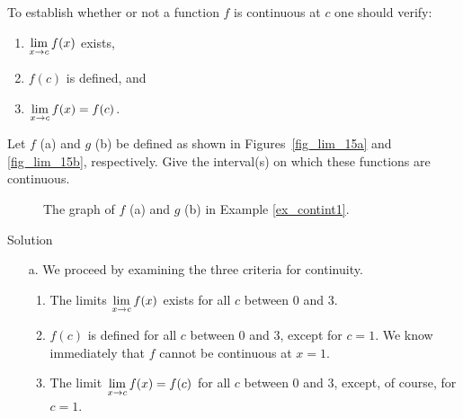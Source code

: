 To establish whether or not a function $f$ is continuous at $c$ one should verify:
		\begin{enumerate}
		\item		$\displaystyle \lim_{x\to c} f(x)$ exists,
		\item		$f(c)$ is defined, and 
		\item		$\displaystyle \lim_{x\to c} f(x) = f(c)$.
		\end{enumerate}
		
		



\begin{example}\label{ex_contint1}
Let $f$ (a) and $g$ (b) be defined as shown in Figures~\ref{fig_lim_15a} and \ref{fig_lim_15b}, respectively. Give the interval(s) on which these functions are continuous.


\begin{figure}[H]
\centerline{
\qquad
{}
}
\caption{The graph of $f$ (a) and $g$ (b) in Example \ref{ex_contint1}. }
\end{figure}




Solution 

\begin{enumerate}
\item [a.] We proceed by examining the three criteria for continuity.
	\begin{enumerate}
	\item		The limits $\displaystyle \lim_{x\to c} f(x)$ exists for all $c$ between 0 and 3.
	\item		$f(c)$ is defined for all $c$ between 0 and 3, except for $c=1$. We know immediately that $f$ cannot be continuous at $x=1$.
	\item		The limit $\displaystyle \lim_{x\to c} f(x) = f(c)$ for all $c$ between 0 and 3, except, of course, for $c=1$. 
	\end{enumerate}


\end{enumerate}
\end{example}
